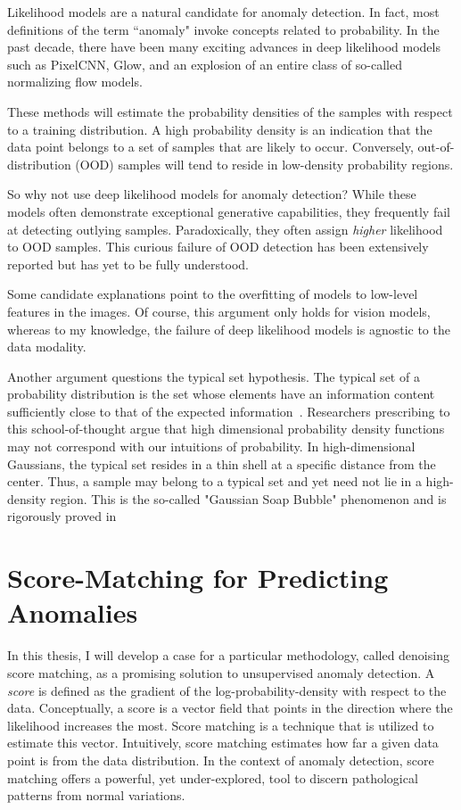 Likelihood models are a natural candidate for anomaly detection. In fact, most definitions of the term ``anomaly" invoke concepts related to probability. In the past decade, there have been many exciting advances in deep likelihood models such as PixelCNN, Glow, and an explosion of an entire class of so-called normalizing flow models.

These methods will estimate the probability densities of the samples with respect to a training distribution. A high probability density is an indication that the data point belongs to a set of samples that are likely to occur.
Conversely, out-of-distribution (OOD) samples will tend to reside in low-density probability regions.


So why not use deep likelihood models for anomaly detection? While these models often demonstrate exceptional generative capabilities, they frequently fail at detecting outlying samples. Paradoxically, they often assign \textit{higher} likelihood to OOD samples. This curious failure of OOD detection has been extensively reported \cite{nalisnick2018do,why_norm_fails,nalisnick2020detecting} but has yet to be fully understood.

Some candidate explanations point to the overfitting of models to low-level features in the images. Of course, this argument only holds for vision models, whereas to my knowledge, the failure of deep likelihood models is agnostic to the data modality.

Another argument questions the typical set hypothesis.
The typical set of a probability distribution is the set whose elements have an information content sufficiently close to that of the expected information~\cite{shannon_1948}.
Researchers prescribing to this school-of-thought argue that high dimensional probability density functions may not correspond with our intuitions of probability. In high-dimensional Gaussians, the typical set resides in a thin shell at a specific distance from the center. Thus, a sample may belong to a typical set and yet need not lie in a high-density region. This is the so-called "Gaussian Soap Bubble" phenomenon and is rigorously proved in \cite{vershynin2018high}


\section{Score-Matching for Predicting Anomalies}

In this thesis, I will develop a case for a particular methodology, called denoising score matching, as a promising solution to unsupervised anomaly detection. A \textit{score} is defined as the gradient of the log-probability-density with respect to the data. Conceptually, a score is a vector field that points in the direction where the likelihood increases the most. Score matching is a technique that is utilized to estimate this vector. Intuitively, score matching estimates how far a given data point is from the data distribution. In the context of anomaly detection, score matching offers a powerful, yet under-explored, tool to discern pathological patterns from normal variations.

